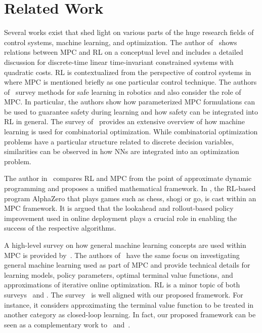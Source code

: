 \section{Related Work}
\label{sec:related}
Several works exist that shed light on various parts of the huge research fields of control systems, machine learning, and optimization.
The author of~\cite{gorges_relations_2017} shows relations between \ac{MPC} and \ac{RL} on a conceptual level and includes a detailed discussion for discrete-time linear time-invariant constrained systems with quadratic costs.
\ac{RL} is contextualized from the perspective of control systems in~\cite{recht_tour_2019} where \ac{MPC} is mentioned briefly as one particular control technique.
The authors of~\cite{brunke_safe_2022} survey methods for safe learning in robotics and also consider the role of MPC.
In particular, the authors show how parameterized \ac{MPC} formulations can be used to guarantee safety during learning and how safety can be integrated into \ac{RL} in general.
The survey of~\cite{bengio_machine_2021} provides an extensive overview of how machine learning is used for combinatorial optimization.
While combinatorial optimization problems have a particular structure related to discrete decision variables, similarities can be observed in how \acp{NN} are integrated into an optimization problem.

The author in~\cite{bertsekas_reinforcement_2019} compares \ac{RL} and \ac{MPC} from the point of approximate dynamic programming and proposes a unified mathematical framework.
In \cite{bertsekas_lessons_2022,bertsekas_newtons_2022}, the RL-based program AlphaZero \cite{silver_mastering_2017,silver_mastering_2017-1} that plays games such as chess, shogi or go, is cast within an MPC framework.
It is argued that the lookahead and rollout-based policy improvement used in online deployment plays a crucial role in enabling the success of the respective algorithms. 

A high-level survey on how general machine learning concepts are used within \ac{MPC} is provided by~\cite{hewing_learning-based_2020}. 
The authors of~\cite{mesbah_fusion_2022} have the same focus on investigating general machine learning used as part of \ac{MPC} and provide technical details for learning models, policy parameters, optimal terminal value functions, and approximations of iterative online optimization.
\ac{RL} is a minor topic of both surveys~\cite{hewing_learning-based_2020} and \cite{mesbah_fusion_2022}. The survey~\cite{mesbah_fusion_2022} is well aligned with our proposed framework. For instance, it considers approximating the terminal value function to be treated in another category as closed-loop learning. In fact, our proposed framework can be seen as a complementary work to~\cite{bertsekas_reinforcement_2019} and~\cite{mesbah_fusion_2022}.

